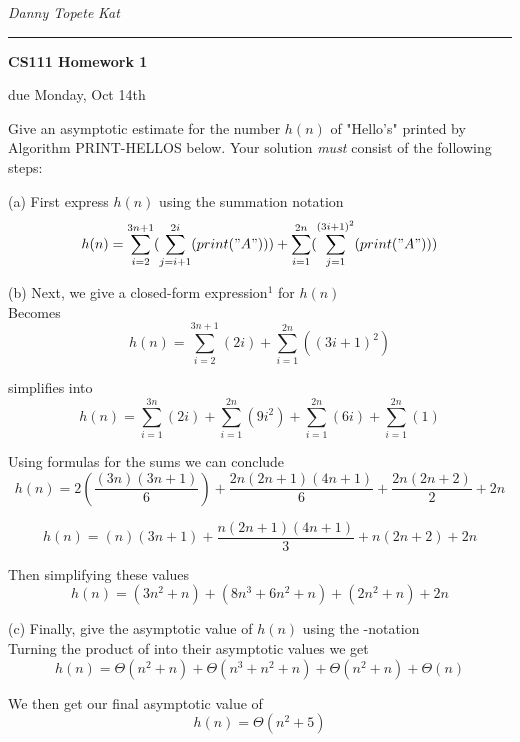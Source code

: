 \documentclass[11pt]{article}
\newcommand{\student}[1]{{\noindent\Large\em {#1} \hfill}\vskip 0.1in}
\newcommand{\assignment}[1]{\centerline{\large\bf CS111 Homework {#1}}}
\newcommand{\duedate}[1]{{\centerline{due {#1}}}}
\newcounter{prnum}
\newenvironment{problem}{{\vskip 0.2in\noindent\bf Problem
       \addtocounter{prnum}{1} \arabic{prnum}.}}{\vskip 0.1in}
\begin{document}
\student{Danny Topete} %
\student{Kat} %
\vskip 0.1in\noindent\hrule\vskip 0.2in
\assignment{1}                           %
\duedate{Monday, Oct 14th}              %


\begin{problem}
Give an asymptotic estimate for the number $h(n)$ of "Hello's" printed by Algorithm PRINT-HELLOS below. 
Your solution \textit{must} consist of the following steps:

(a) First express $h(n)$
using the summation notation \Sigma \\

\begin{equation*}
  h(n) = \sum_{i=2}^{3n+1} (\sum_{j=i+1}^{2i}(print("A"))) 
  + \sum_{i=1}^{2n}(\sum_{j=1}^{(3i+1)^2}(print("A")))
\end{equation*}

(b) Next, we give a closed-form expression$^1$ for $h(n)$ \\

Becomes
\begin{equation}
  h(n) = \sum_{i=2}^{3n+1}(2i)  
  + \sum_{i=1}^{2n}((3i+1)^2)
\end{equation}

simplifies into
\begin{equation}
  h(n) = \sum_{i=1}^{3n}(2i)  
  + \sum_{i=1}^{2n}(9i^2)
  + \sum_{i=1}^{2n}(6i)
  + \sum_{i=1}^{2n}(1)
\end{equation}

Using formulas for the sums we can conclude
\begin{equation}
  h(n) = 2(\frac{(3n)(3n+1)}{6})
  + \frac{2n(2n+1)(4n+1)}{6} 
  + \frac{2n(2n+2)}{2} 
  + 2n 
\end{equation}

\begin{equation}
  h(n) = (n)(3n+1)
  + \frac{n(2n+1)(4n+1)}{3} 
  + n(2n+2) 
  + 2n 
\end{equation}

\smallskip
Then simplifying these values
\begin{equation}
  h(n) = (3n^2 + n)
  + (8n^3 + 6n^2 + n)
  + (2n^2 + n)
  + 2n 
\end{equation}

(c) Finally, give the asymptotic value of $h(n)$ using the \Theta-notation \\

Turning the product of into their asymptotic values we get
\begin{equation}
  h(n) = \Theta(n^2 + n)
  + \Theta(n^3 + n^2 + n)
  + \Theta(n^2 + n)
  + \Theta(n) 
\end{equation}

We then get our final asymptotic value of
\begin{equation}
h(n) = \Theta(n^2 + 5)
\end{equation}

\end{problem}
\end{document}
